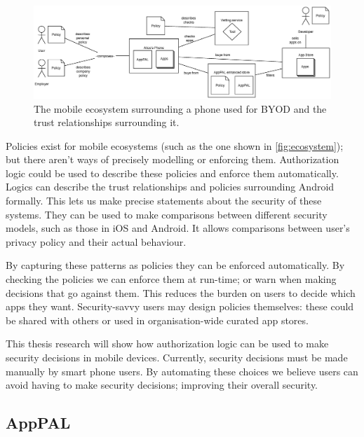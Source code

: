 \documentclass[a4paper]{scrartcl}
\begin{document}
\begin{figure}[]
  \centering
  \includegraphics[width=1.0\linewidth]{images/ecosystem.eps}
  \caption{The mobile ecosystem surrounding a phone used for \ac{BYOD} and the trust relationships surrounding it.}
  \label{fig:ecosystem}
\end{figure}

Policies exist for mobile ecosystems (such as the one shown in \autoref{fig:ecosystem}); but there aren't ways of precisely modelling or enforcing them.
Authorization logic could be used to describe these policies and enforce them automatically.
Logics can describe the trust relationships and policies surrounding Android formally.
This lets us make precise statements about the security of these systems.
They can be used to make comparisons between different security models, such as those in iOS and Android.
It allows comparisons between user's privacy policy and their actual behaviour.

By capturing these patterns as policies they can be enforced automatically.
By checking the policies we can enforce them at run-time; or warn when making decisions that go against them.
This reduces the burden on users to decide which apps they want.
Security-savvy users may design policies themselves: these could be shared with others or used in organisation-wide curated app stores.

This thesis research will show how authorization logic can be used to make security decisions in mobile devices.
Currently, security decisions must be made manually by smart phone users.
By automating these choices we believe users can avoid having to make security decisions; improving their overall security.

\subsection{AppPAL}
\end{document}
